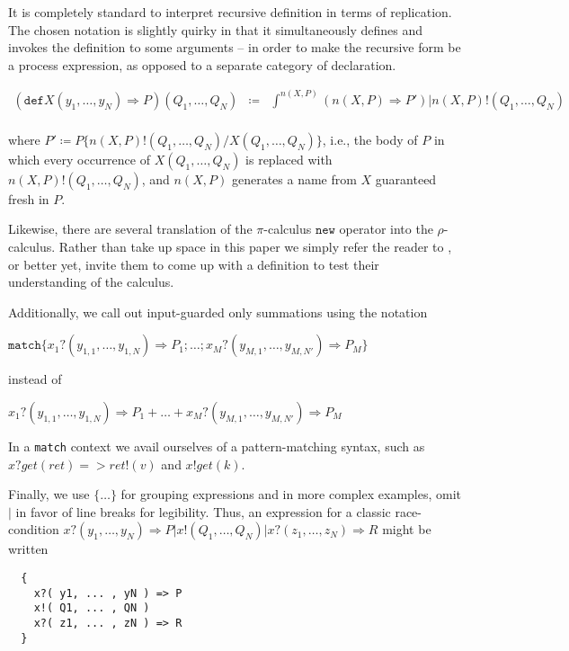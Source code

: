 \documentclass[]{amsart}
\newcommand{\id}[1]{\texttt{#1}}
\newcommand{\juxtap}{\mathbin{\id{|}}}
\newcommand{\binpar}[2]{#1 \juxtap #2}
\newcommand{\bangxp}[2]{\int^{#2} #1}
\newcommand{\defneqls}{\coloneqq}
\theoremstyle{definition}
\theoremstyle{remark}
\numberwithin{equation}{subsection}
\newcommand{\pic}{$\pi$-calculus}
\newcommand{\rhoc}{$\rho$-calculus}
\begin{document}
It is completely standard to interpret recursive definition in terms
of replication. The chosen notation is slightly quirky in that it
simultaneously defines and invokes the definition to some arguments --
in order to make the recursive form be a process expression, as
opposed to a separate category of declaration.

\begin{eqnarray*}
  (\texttt{def} {X}{( y_1, \ldots, y_N )} \Rightarrow {P}){( Q_1, \ldots, Q_N )} & \defneqls & \binpar{\bangxp{(n( X, P ) \Rightarrow P')}{n( X, P )}}{n( X, P )!( Q_1, \ldots, Q_N )} \\  
\end{eqnarray*}

where $P' \defneqls P \{ n( X, P )!( Q_1, \ldots, Q_N )/ X( Q_1,
\ldots, Q_N )\}$, i.e., the body of $P$ in which every occurrence of
$X( Q_1, \ldots, Q_N )$ is replaced with $n( X, P )!( Q_1, \ldots, Q_N
)$, and $n( X, P )$ generates a name from $X$ guaranteed fresh in $P$.

Likewise, there are several translation of the \pic\; $\texttt{new}$
operator into the \rhoc. Rather than take up space in this paper we
simply refer the reader to \cite{DBLP:journals/entcs/MeredithR05}, or
better yet, invite them to come up with a definition to test their
understanding of the calculus.

Additionally, we call out input-guarded only summations using the notation

$\texttt{match}\{ x_1?( y_{1,1}, \ldots, y_{1,N} ) \Rightarrow P_1 ; \ldots ; x_M?(y_{M,1}, \ldots, y_{M,N'} ) \Rightarrow P_M \}$ 

instead of 

$x_1?( y_{1,1}, \ldots, y_{1,N} ) \Rightarrow P_1 + \ldots + x_M?( y_{M,1},\ldots, y_{M,N'} ) \Rightarrow P_M$

In a \texttt{match} context we avail ourselves of a pattern-matching
syntax, such as $x ? get( ret ) => ret!( v )$ and $x ! get( k )$.

Finally, we use $\{ \ldots \}$ for grouping expressions and in more complex examples, omit
$\binpar{}{}$ in favor of line breaks for legibility. Thus, an expression for a classic race-condition $\binpar{ x?( y_1, \ldots, y_N ) \Rightarrow P}{\binpar{x!( Q_1, \ldots, Q_N )}{ x?( z_1, \ldots, z_N ) \Rightarrow R}}$ might be written
\begin{lstlisting}
  {
    x?( y1, ... , yN ) => P
    x!( Q1, ... , QN )
    x?( z1, ... , zN ) => R
  }
\end{lstlisting}
\end{document}
